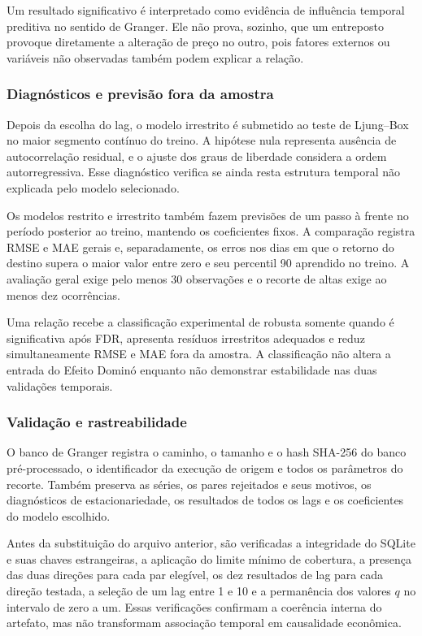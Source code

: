 \documentclass[12pt,a4paper]{article}
\begin{document}
Um resultado significativo é interpretado como evidência de influência
temporal preditiva no sentido de Granger. Ele não prova, sozinho, que um
entreposto provoque diretamente a alteração de preço no outro, pois fatores
externos ou variáveis não observadas também podem explicar a relação.

\subsubsection{Diagnósticos e previsão fora da amostra}

Depois da escolha do lag, o modelo irrestrito é submetido ao teste de
Ljung--Box no maior segmento contínuo do treino. A hipótese nula representa
ausência de autocorrelação residual, e o ajuste dos graus de liberdade considera
a ordem autorregressiva. Esse diagnóstico verifica se ainda resta estrutura
temporal não explicada pelo modelo selecionado.

Os modelos restrito e irrestrito também fazem previsões de um passo à frente no
período posterior ao treino, mantendo os coeficientes fixos. A comparação
registra RMSE e MAE gerais e, separadamente, os erros nos dias em que o retorno
do destino supera o maior valor entre zero e seu percentil 90 aprendido no
treino. A avaliação geral exige pelo menos 30 observações e o recorte de altas
exige ao menos dez ocorrências.

Uma relação recebe a classificação experimental de robusta somente quando é
significativa após FDR, apresenta resíduos irrestritos adequados e reduz
simultaneamente RMSE e MAE fora da amostra. A classificação não altera a entrada
do Efeito Dominó enquanto não demonstrar estabilidade nas duas validações
temporais.

\subsubsection{Validação e rastreabilidade}

O banco de Granger registra o caminho, o tamanho e o hash SHA-256 do banco
pré-processado, o identificador da execução de origem e todos os parâmetros do
recorte. Também preserva as séries, os pares rejeitados e seus motivos, os
diagnósticos de estacionariedade, os resultados de todos os lags e os
coeficientes do modelo escolhido.

Antes da substituição do arquivo anterior, são verificadas a integridade do
SQLite e suas chaves estrangeiras, a aplicação do limite mínimo de cobertura,
a presença das duas direções para cada par elegível, os dez resultados de lag
para cada direção testada, a seleção de um lag entre 1 e 10 e a permanência dos
valores $q$ no intervalo de zero a um. Essas verificações confirmam a coerência
interna do artefato, mas não transformam associação temporal em causalidade
econômica.
\end{document}
